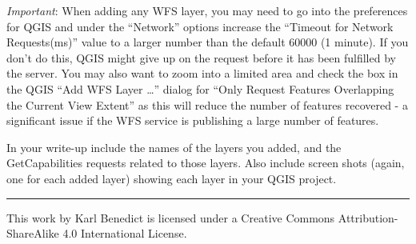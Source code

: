 \documentclass[]{book}
\begin{document}
\emph{Important}: When adding any WFS layer, you may need to go into the
preferences for QGIS and under the ``Network'' options increase the
``Timeout for Network Requests(ms)'' value to a larger number than the
default 60000 (1 minute). If you don't do this, QGIS might give up on
the request before it has been fulfilled by the server. You may also
want to zoom into a limited area and check the box in the QGIS ``Add WFS
Layer \ldots{}'' dialog for ``Only Request Features Overlapping the
Current View Extent'' as this will reduce the number of features
recovered - a significant issue if the WFS service is publishing a large
number of features.

In your write-up include the names of the layers you added, and the
GetCapabilities requests related to those layers. Also include screen
shots (again, one for each added layer) showing each layer in your QGIS
project.  

\begin{center}\rule{0.5\linewidth}{\linethickness}\end{center}

This work by {Karl Benedict} is licensed under a Creative Commons
Attribution-ShareAlike 4.0 International License.
\end{document}

